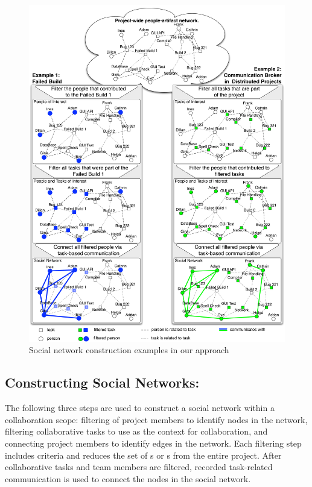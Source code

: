 \begin{figure}[t!]
\begin{center}
\includegraphics[height=0.9465\textheight]{./figures/grand_figure}
\caption{Social network construction examples in our approach}
\label{fig:network}
\end{center}
\end{figure}

\subsection{Constructing Social Networks:}
The following three steps are used to construct a social network within a
collaboration scope: filtering of project members to identify nodes in the
network, filtering collaborative tasks to use as the context for collaboration,
and connecting project members to identify edges in the network. Each filtering
step includes criteria and reduces the set of \people s or \cu s from the entire
project. After collaborative tasks and team members are filtered, recorded
task-related communication is used to connect the nodes in the social network.

